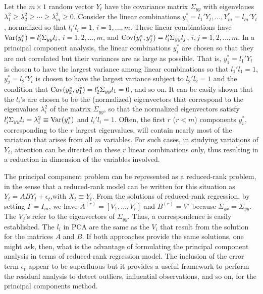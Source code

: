 Let the $m \times 1$ random vector $Y_t$ have the covariance matrix $\Sigma_{yy}$ with eigenvlaues $\lambda_1^2 \geq \lambda_2^2 \geq \cdots \geq \lambda_m^2 \geq 0$. Consider the linear combinations $y_1^*= l_1' Y_t, \ldots, Y_m^* = l_m' Y_t$, normalized so that $l_i' l_i=1$, $i=1, \ldots, m$. These linear combinations have $\operatorname{Var}(y_i^*)= l_i' \Sigma_{yy} l_i$, $i= 1, 2, \ldots, m$, and $\operatorname{Cov}(y_i^*,y_j^*)= l_i' \Sigma_{yy} l_j$, $i,j= 1, 2, \ldots, m$. In a principal component analysis, the linear combinations $y_i^*$ are chosen so that they are not correlated but their variances are as large as possible. That is, $y_1^*= l_1' Y_t$ is chosen to have the largest variance among linear combinations so that $l_1' l_1= 1$, $y_2^*= l_2' Y_t$ is chosen to have the largest variance subject to $l_2' l_2=1$ and the condition that $\operatorname{Cov}(y_2^*,y_1^*)= l_2' \Sigma_{yy}l_1=0$, and so on. It can be easily shown that the $l_i$'s are chosen to be the (normalized) eigenvectors that correspond to the eigenvalues $\lambda_i^2$ of the matrix $\Sigma_{yy}$, so that the normalized eigenvectors satisfy $l_i' \Sigma_{yy}l_i= \lambda_i^2 \equiv \operatorname{Var}(y_i^*)$ and $l_i' l_i=1$. Often, the first $r$ ($r<m$) components $y_i^*$, corresponding to the $r$ largest eigenvalues, will contain nearly most of the variation that arises from all $m$ variables. For such cases, in studying variations of $Y_t$, attention can be directed on these $r$ linear combinations only, thus resulting in a reduction in dimension of the variables involved. 


The principal component problem can be represented as a reduced-rank problem, in the sense that a reduced-rank model can be written for this situation as $Y_t= ABY_t + \epsilon_t$,with $X_t \equiv Y_t$. From the solutions of reduced-rank regression, by setting $\Gamma= I_m$, we have $A^{(r)}= [V_1, \ldots, V_r]$ and $B^{(r)}= V'$ because $\Sigma_{yx}= \Sigma_{yy}$. The $V_j$'s refer to the eigenvectors of $\Sigma_{yy}$. Thus, a correspondence is easily established. The $l_i$ in PCA are the same as the $V_i$ that result from the solution for the matrices $A$ and $B$. If both approaches provide the same solutions, one might ask, then, what is the advantage of formulating the principal component analysis in terms of reduced-rank regression model. The inclusion of the error term $\epsilon_t$ appear to be superfluous but it provides a useful framework to perform the residual analysis to detect outliers, influential observations, and so on, for the principal components method. \twomedskip


